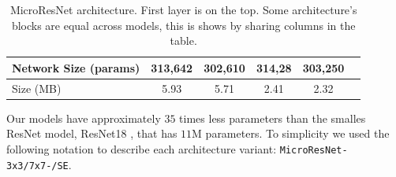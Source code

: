 \documentclass[../document.tex]{subfiles}
\begin{document}
\begin{table}[htbp]
\begin{tabular}{@{}l|c|c|c|cc@{}}
               Network Size (params) &  313,642 & 302,610  &  314,28 & 303,250 \\
            \hline
               Size (MB) & 5.93 & 5.71 &  2.41 & 2.32 \\ 
               \hline 
        \end{tabular}
        \caption{MicroResNet architecture. First layer is on the top. Some architecture's blocks are equal across models, this is shows by sharing columns in the table.}
        \label{tab : microresnet}
    \end{table}
Our models have approximately $35$ times less parameters than the smalles ResNet model, ResNet18 \cite{he2015deep}, that has $11$M parameters. To simplicity we used the following notation to describe each architecture variant: \texttt{MicroResNet-{3x3/7x7}-{/SE}}.
\begin{figure}[htbp]
    \centering
    \begin{subfigure}[b]{0.22\textwidth}

\end{subfigure}
\end{figure}
\end{document}
